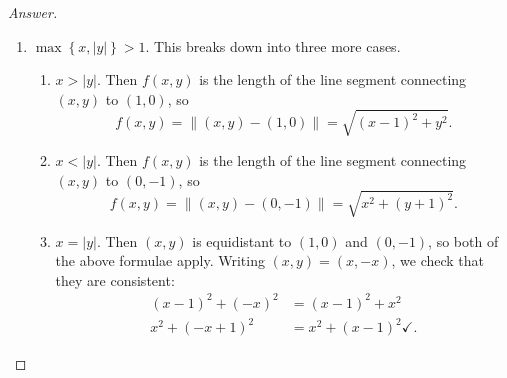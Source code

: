 \documentclass[12pt]{article}
\newcommand\setb[1]{\left \{ #1 \right \}}
\newcommand{\norm}[1]{\left\| #1 \right\|}
\theoremstyle{definition}
\begin{document}
\begin{proof}[Answer]
\begin{enumerate}
\begin{enumerate}
\begin{figure}[H]
                \label{fig:fig3}
            \end{figure}
            \item $\max\setb{x,|y|} > 1$. This breaks down into three more cases.
            \begin{enumerate}
                \item $x > |y|$. Then $f(x,y)$ is the length of the line segment connecting $(x,y)$ to $(1,0)$, so 
                \[
                    f(x,y) = \norm{ (x,y) - (1,0) } = \sqrt{(x-1)^2+y^2}.
                \]
                \item $x < |y|$. Then $f(x,y)$ is the length of the line segment connecting $(x,y)$ to $(0,-1)$, so 
                \[
                    f(x,y) = \norm{ (x,y) - (0,-1) } = \sqrt{x^2+(y+1)^2}.
                \]
                \item $x = |y|$. Then $(x,y)$ is equidistant to $(1,0)$ and $(0,-1)$, so both of the above formulae apply. Writing $(x,y) = (x,-x)$, we check that they are consistent:
                \begin{align*}
                    (x-1)^2 + (-x)^2 & = (x-1)^2 + x^2 \\
                    x^2 + (-x+1)^2 & = x^2 + (x-1)^2 \checkmark.
                \end{align*}
            \end{enumerate}
             \begin{figure}[h]


\end{figure}
\end{enumerate}
\end{enumerate}
\end{proof}
\end{document}
